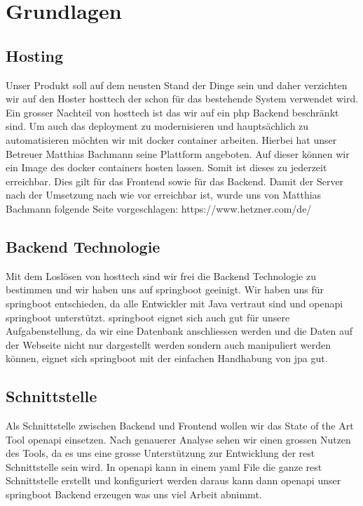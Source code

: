 \documentclass[../main.tex]{subfiles}
\begin{document}
	\section{Grundlagen}
	
	\subsection{Hosting}
	Unser Produkt soll auf dem neusten Stand der Dinge sein und daher verzichten wir auf den Hoster \gls{hosttech} der schon für das bestehende System verwendet wird. Ein grosser Nachteil von \gls{hosttech} ist das wir auf ein \gls{php} Backend beschränkt sind. Um auch das \gls{deployment} zu modernisieren und hauptsächlich zu automatisieren möchten wir mit \gls{docker} \gls{container} arbeiten. Hierbei hat unser Betreuer Matthias Bachmann seine Plattform angeboten. Auf dieser können wir ein Image des \gls{docker} \gls{container}s hosten lassen. Somit ist dieses zu jederzeit erreichbar. Dies gilt für das Frontend sowie für das Backend.
	Damit der Server nach der Umsetzung nach wie vor erreichbar ist, wurde uns von Matthias Bachmann folgende Seite vorgeschlagen: https://www.hetzner.com/de/
	
	\subsection{Backend Technologie}
	Mit dem Loslösen von \gls{hosttech} sind wir frei die Backend Technologie zu bestimmen und wir haben uns auf \gls{springboot} geeinigt. Wir haben uns für \gls{springboot} entschieden, da alle Entwickler mit Java vertraut sind und \gls{openapi} \gls{springboot} unterstützt. \gls{springboot} eignet sich auch gut für unsere Aufgabenstellung, da wir eine Datenbank anschliessen werden und die Daten auf der Webseite nicht nur dargestellt werden sondern auch manipuliert werden können, eignet sich \gls{springboot} mit der einfachen Handhabung von \gls{jpa} gut.
	
	\subsection{Schnittstelle}
	Als Schnittstelle zwischen Backend und Frontend wollen wir das State of the Art Tool \gls{openapi} einsetzen. Nach genauerer Analyse sehen wir einen grossen Nutzen des Tools, da es uns eine grosse Unterstützung zur Entwicklung der \gls{rest} Schnittstelle sein wird. In \gls{openapi} kann in einem \gls{yaml} File die ganze \gls{rest} Schnittstelle erstellt und konfiguriert werden daraus kann dann \gls{openapi} unser \gls{springboot} Backend erzeugen was uns viel Arbeit abnimmt.
	
\end{document}
